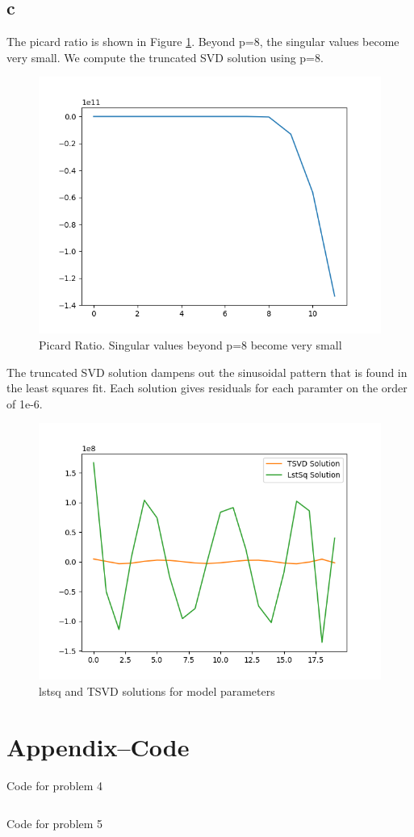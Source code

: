 \documentclass{article}
\begin{document}
\subsection*{c}
The picard ratio is shown in Figure \ref{picard}. Beyond p=8, the singular values become very small. We compute the truncated SVD solution using p=8. 
\begin{figure}
    \centering
    \includegraphics[width=4.5in]{picard.png}
    \caption{Picard Ratio. Singular values beyond p=8 become very small}
    \label{picard}
\end{figure}
The truncated SVD solution dampens out the  sinusoidal pattern that is found in the least squares fit. Each solution gives residuals for each paramter on the order of 1e-6. 

\begin{figure}
    \centering
    \includegraphics[width=4.5in]{m5solutions.png}
    \caption{lstsq and TSVD solutions for model parameters}
    \label{m5sol}
\end{figure}

\newpage
\section{Appendix--Code}
Code for problem 4
\inputminted{python}{ch3group.py}
Code for problem 5 
\inputminted{python}{ch3group5.py}
\end{document}

